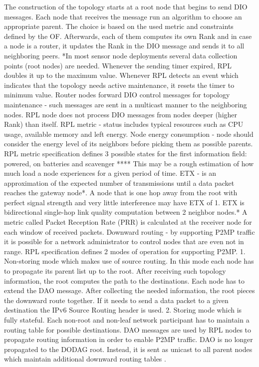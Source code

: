 	The construction of the topology starts at a root node that begins to send DIO messages. Each node that receives the message run an algorithm to choose an appropriate parent. The choice is based on the used metric and constraints defined by the OF. Afterwards, each of them computes its own Rank and in case a node is a router, it updates the Rank in the DIO message and sends it to all neighboring peers. *In most sensor node deployments several data collection points (root nodes) are needed.
	Whenever the sending timer expired, RPL doubles it up to the maximum value. Whenever RPL detects an event which indicates that the topology needs active maintenance, it resets the timer to minimum value. 
	Router nodes forward DIO control messages for topology maintenance - such messages are sent in a multicast manner to the neighboring nodes. RPL node does not process DIO messages from nodes deeper (higher Rank) than itself. 
	RPL metric - status includes typical resources such as CPU usage, available memory and left energy. Node energy consumption - node should consider the energy level of its neighbors before picking them as possible parents. RPL metric specification defines 3 possible states for the first information field: powered, on batteries and scavenger **** This may be a rough estimation of how much load a node experiences for a given period of time. ETX - is an approximation of the expected number of transmissions until a data packet reaches the gateway node*. A node that is one hop away from the root with perfect signal strength and very little interference may have ETX of 1. ETX is bidirectional single-hop link quality computation between 2 neighbor nodes.* A metric called Packet Reception Rate (PRR) is calculated at the receiver node for each window of received packets.
	Downward routing - by supporting P2MP traffic it is possible for a network administrator to control nodes that are even not in range. RPL specification defines 2 modes of operation for supporting P2MP. 1. Non-storing mode which makes use of source routing. In this mode each node has to propagate its parent list up to the root. After receiving such topology information, the root computes the path to the destinations. Each node has to extend the DAO message. After collecting the needed information, the root pieces the downward route together. If it needs to send a data packet to a given destination the IPv6 Source Routing header is used.  2. Storing mode which is fully stateful. Each non-root and non-leaf network participant has to maintain a routing table for possible destinations. DAO messages are used by RPL nodes to propagate routing information in order to enable P2MP traffic. DAO is no longer propagated to the DODAG root. Instead, it is sent as unicast to all parent nodes which maintain additional downward routing tables \cite{tsvetkov2011rpl}.
	
